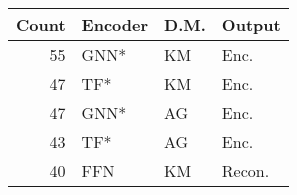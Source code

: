 \begin{tabular}{rlll}
\toprule
Count & Encoder & D.M. & Output \\
\midrule
55 & GNN* & KM & Enc. \\
47 & TF* & KM & Enc. \\
47 & GNN* & AG & Enc. \\
43 & TF* & AG & Enc. \\
40 & FFN & KM & Recon. \\
\bottomrule
\end{tabular}
